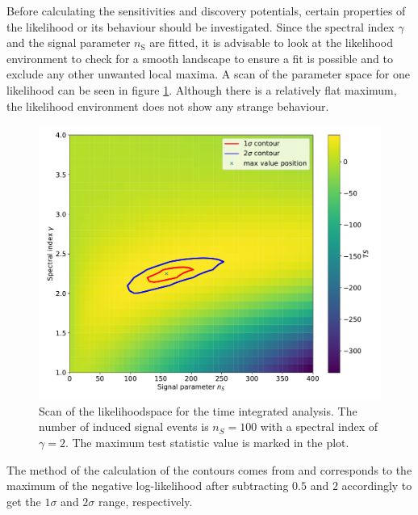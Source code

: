 Before calculating the sensitivities and discovery potentials, certain properties of the likelihood or its behaviour should be investigated.
Since the spectral index $\gamma$ and the signal parameter $n_\text{S}$ are fitted, it is advisable to look at the likelihood environment to check for a smooth landscape to ensure a fit is possible and to exclude any other unwanted local maxima.
A scan of the parameter space for one likelihood can be seen in figure \ref{fig:llh_scan_time_int}.
Although there is a relatively flat maximum, the likelihood environment does not show any strange behaviour.
\begin{figure}
    \centering
    \includegraphics[width=\linewidth]{Plots/05_csky/llh_scan_time_int.pdf}
    \caption{Scan of the likelihoodspace for the time integrated analysis. The number of induced signal events is $n_S = \num{100}$ with a spectral index of $\gamma = 2$. The maximum test statistic value is marked in the plot.}
    \label{fig:llh_scan_time_int}
\end{figure}
The method of the calculation of the contours comes from \cite{Blobel} and corresponds to the maximum of the negative log-likelihood after subtracting $\num{0.5}$ and $\num{2}$ accordingly to get the $1\sigma$ and $2\sigma$ range, respectively.

